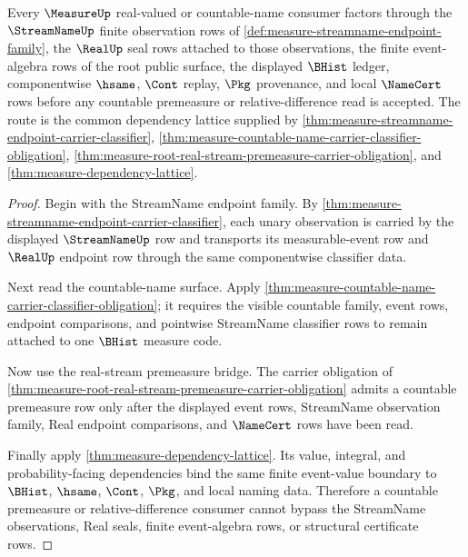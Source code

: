 \begin{theorem}
\label{thm:measure-real-stream-dependency-lattice}
Every $\MeasureUp$ real-valued or countable-name consumer factors through the $\StreamNameUp$ finite observation rows of \autoref{def:measure-streamname-endpoint-family}, the $\RealUp$ seal rows attached to those observations, the finite event-algebra rows of the root public surface, the displayed $\BHist$ ledger, componentwise $\hsame$, $\Cont$ replay, $\Pkg$ provenance, and local $\NameCert$ rows before any countable premeasure or relative-difference read is accepted. The route is the common dependency lattice supplied by \autoref{thm:measure-streamname-endpoint-carrier-classifier}, \autoref{thm:measure-countable-name-carrier-classifier-obligation}, \autoref{thm:measure-root-real-stream-premeasure-carrier-obligation}, and \autoref{thm:measure-dependency-lattice}.
\end{theorem}
\begin{proof}
Begin with the StreamName endpoint family. By \autoref{thm:measure-streamname-endpoint-carrier-classifier}, each unary observation is carried by the displayed $\StreamNameUp$ row and transports its measurable-event row and $\RealUp$ endpoint row through the same componentwise classifier data.

Next read the countable-name surface. Apply \autoref{thm:measure-countable-name-carrier-classifier-obligation}; it requires the visible countable family, event rows, endpoint comparisons, and pointwise StreamName classifier rows to remain attached to one $\BHist$ measure code.

Now use the real-stream premeasure bridge. The carrier obligation of \autoref{thm:measure-root-real-stream-premeasure-carrier-obligation} admits a countable premeasure row only after the displayed event rows, StreamName observation family, Real endpoint comparisons, and $\NameCert$ rows have been read.

Finally apply \autoref{thm:measure-dependency-lattice}. Its value, integral, and probability-facing dependencies bind the same finite event-value boundary to $\BHist$, $\hsame$, $\Cont$, $\Pkg$, and local naming data. Therefore a countable premeasure or relative-difference consumer cannot bypass the StreamName observations, Real seals, finite event-algebra rows, or structural certificate rows.
\end{proof}
